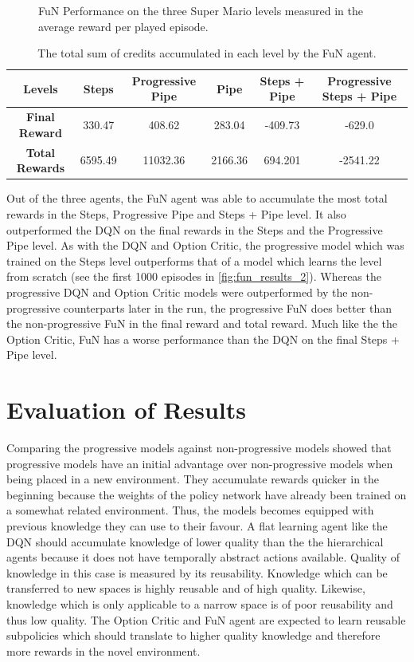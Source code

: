 \documentclass[notitlepage,a4paper,11pt]{article}
\begin{document}
\begin{figure}[htb!]
\begin{subfigure}[t]{0.32\textwidth}
         \caption{}
         \label{fig:fun_results_3}
     \end{subfigure}
        \caption{FuN Performance on the three Super Mario levels measured in the average reward per played episode.}
        \label{fig:fun_results}
        
\end{figure}

\begin{table}[htb!]
\centering
\begin{tabular}{ |c|c|c|c|c|c| } 
	\hline
	\textbf{Levels} & Steps & Progressive Pipe  & Pipe & Steps + Pipe & Progressive Steps + Pipe \\
	\hline
	\textbf{Final Reward} & 330.47 & 408.62 & 283.04 & -409.73 & -629.0 \\
	\hline
	\textbf{Total Rewards} & 6595.49 & 11032.36 & 2166.36 & 694.201 & -2541.22 \\
	\hline
\end{tabular}
\caption{The total sum of credits accumulated in each level by the FuN agent.}


\end{table}

Out of the three agents, the FuN agent was able to accumulate the most total rewards in the Steps, Progressive Pipe and Steps + Pipe level. It also outperformed the DQN on the final rewards in the Steps and the Progressive Pipe level. As with the DQN and Option Critic, the progressive model which was trained on the Steps level outperforms that of a model which learns the level from scratch (see the first 1000 episodes in \ref{fig:fun_results_2}). Whereas the progressive DQN and Option Critic models were outperformed by the non-progressive counterparts later in the run, the progressive FuN does better than the non-progressive FuN in the final reward and total reward. Much like the the Option Critic, FuN has a worse performance than the DQN on the final Steps + Pipe level. 

\section{Evaluation of Results}
Comparing the progressive models against non-progressive models showed that progressive models have an initial advantage over non-progressive models when being placed in a new environment. They accumulate rewards quicker in the beginning because the weights of the policy network have already been trained on a somewhat related environment. Thus, the models becomes equipped with previous knowledge they can use to their favour. A flat learning agent like the DQN should accumulate knowledge of lower quality than the the hierarchical agents because it does not have temporally abstract actions available. Quality of knowledge in this case is measured by its reusability. Knowledge which can be transferred to new spaces is highly reusable and of high quality. Likewise, knowledge which is only applicable to a narrow space is of poor reusability and thus low quality. The Option Critic and FuN agent are expected to learn reusable subpolicies which should translate to higher quality knowledge and therefore more rewards in the novel environment.
\end{document}
